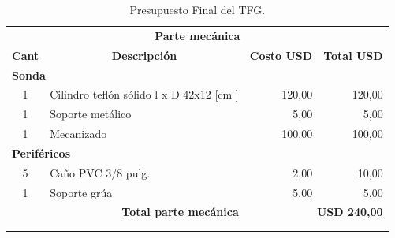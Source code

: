 \begin{table}[t]
\protect\caption{Presupuesto Final del TFG.}
     \label{tab:presu}
     \centering
\begin{tabular}{c l c c}
\hline
\multicolumn{4}{c}{\textbf{Parte mecánica}}\\ 
\multicolumn{1}{c}{\textbf{Cant}}                 & 
\multicolumn{1}{c}{\textbf{Descripción}}           & 
\multicolumn{1}{c}{\textbf{Costo USD}}             & 
\multicolumn{1}{c}{\textbf{Total USD}} \\ 
\hline
\multicolumn{2}{l}{\textbf{Sonda}}                & 
\multicolumn{2}{l}{} \\ 
\hline
\multicolumn{1}{c}{1}                             & 
\multicolumn{1}{l}{Cilindro teflón sólido l x D 42x12 {[}cm {]}}        & 
\multicolumn{1}{r}{120,00}                            & 
\multicolumn{1}{r}{120,00}                \\ 
\multicolumn{1}{c}{1}                             & 
\multicolumn{1}{l}{Soporte metálico}               & 
\multicolumn{1}{r}{5,00}                              & 
\multicolumn{1}{r}{5,00}                  \\ 
\multicolumn{1}{c}{1}                             & 
\multicolumn{1}{l}{Mecanizado}               & 
\multicolumn{1}{r}{100,00}                              & 
\multicolumn{1}{r}{100,00}                  \\ 
\multicolumn{2}{l}{\textbf{Periféricos}}          & 
\multicolumn{2}{c}{}                                                             \\ 
\hline
\multicolumn{1}{c}{5}                              & 
\multicolumn{1}{l}{Caño PVC 3/8 pulg.}             & 
\multicolumn{1}{r}{2,00}                              & 
\multicolumn{1}{r}{10,00}                 \\ 
\multicolumn{1}{c}{1}                             & 
\multicolumn{1}{l}{Soporte grúa}                   & 
\multicolumn{1}{r}{5,00}                              & 
\multicolumn{1}{r}{5,00}                  \\ 
\multicolumn{2}{r}{\textbf{Total parte mecánica}} & 
\multicolumn{2}{r}{\textbf{USD 240,00}}                                             \\ 
\hline                                              &                                                                                                          &                                                                                                          &                                         \\  \\ 

\end{tabular}
\end{table}
